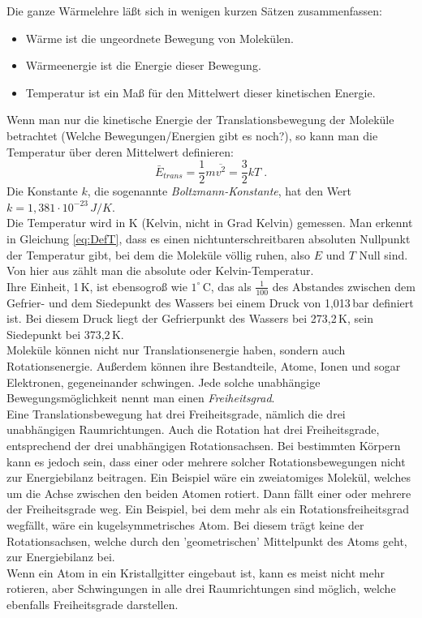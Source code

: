 Die ganze Wärmelehre läßt sich in wenigen kurzen Sätzen zusammenfassen: 
\begin{itemize}
 \item Wärme ist die ungeordnete Bewegung von Molekülen.
 \item Wärmeenergie ist die Energie dieser Bewegung.
 \item Temperatur ist ein Maß für den Mittelwert dieser kinetischen Energie.
\end{itemize}

Wenn man nur die kinetische Energie der Translationsbewegung der Moleküle betrachtet (Welche Bewegungen/Energien gibt es noch?), so kann man die Temperatur über deren Mittelwert definieren:
\begin{equation} \label{eq:DefT}
 \bar{E}_{trans} = \frac{1}{2}m\overline{v^2} = \frac{3}{2}kT\; .
\end{equation}
Die Konstante $k$, die sogenannte \textit{Boltzmann-Konstante}, hat den Wert $k=1,381\cdot10^{-23}\,J/K$.\\
Die Temperatur wird in K (Kelvin, nicht in Grad Kelvin) gemessen. Man erkennt in Gleichung \ref{eq:DefT}, dass es einen nichtunterschreitbaren absoluten Nullpunkt der Temperatur gibt, bei dem die Moleküle völlig ruhen, also $E$ und $T$ Null sind. Von hier aus zählt man die absolute oder Kelvin-Temperatur.\\
Ihre Einheit, 1\,K, ist ebensogroß wie $1^{\circ}$\,C, das als $\frac{1}{100}$ des Abstandes zwischen dem Gefrier- und dem Siedepunkt des Wassers bei einem Druck von 1,013\,bar definiert ist. Bei diesem Druck liegt der Gefrierpunkt des Wassers bei 273,2\,K, sein Siedepunkt bei 373,2\,K.\\

Moleküle können nicht nur Translationsenergie haben, sondern auch Rotationsenergie. Außerdem können ihre Bestandteile, Atome, Ionen und sogar Elektronen, gegeneinander schwingen. Jede solche unabhängige Bewegungsmöglichkeit nennt man einen \textit{Freiheitsgrad}.\\
Eine Translationsbewegung hat drei Freiheitsgrade, nämlich die drei unabhängigen Raumrichtungen. Auch die Rotation hat drei Freiheitsgrade, entsprechend der drei unabhängigen Rotationsachsen. Bei bestimmten Körpern kann es jedoch sein, dass einer oder mehrere solcher Rotationsbewegungen nicht zur Energiebilanz beitragen. Ein Beispiel wäre ein zweiatomiges Molekül, welches um die Achse zwischen den beiden Atomen rotiert. Dann fällt einer oder mehrere der Freiheitsgrade weg. Ein Beispiel, bei dem mehr als ein Rotationsfreiheitsgrad wegfällt, wäre ein kugelsymmetrisches Atom. Bei diesem trägt keine der Rotationsachsen, welche durch den 'geometrischen' Mittelpunkt des Atoms geht, zur Energiebilanz bei.\\
Wenn ein Atom in ein Kristallgitter eingebaut ist, kann es meist nicht mehr rotieren, aber Schwingungen in alle drei Raumrichtungen sind möglich, welche ebenfalls Freiheitsgrade darstellen.\\

